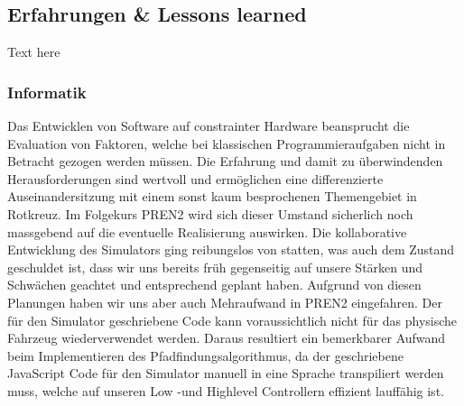 \documentclass[main.tex]{subfiles} %
\begin{document}

\subsection{Erfahrungen \& Lessons learned}

Text here

\subsubsection{Informatik}
Das Entwicklen von Software auf constrainter Hardware beansprucht die Evaluation von
Faktoren, welche bei klassischen Programmieraufgaben nicht in Betracht gezogen werden müssen.
Die Erfahrung und damit zu überwindenden Herausforderungen sind wertvoll und ermöglichen eine differenzierte
Auseinandersitzung mit einem sonst kaum besprochenen Themengebiet in Rotkreuz.
Im Folgekurs PREN2 wird sich dieser Umstand sicherlich noch massgebend auf die eventuelle Realisierung auswirken.
Die kollaborative Entwicklung des Simulators ging reibungslos von statten, was auch dem Zustand geschuldet ist, dass wir
uns bereits früh gegenseitig auf unsere Stärken und Schwächen geachtet und entsprechend geplant haben.
Aufgrund von diesen Planungen haben wir uns aber auch Mehraufwand in PREN2 eingefahren. Der für den Simulator geschriebene
Code kann voraussichtlich nicht für das physische Fahrzeug wiederverwendet werden. Daraus resultiert ein bemerkbarer
Aufwand beim Implementieren des Pfadfindungsalgorithmus, da der geschriebene JavaScript Code für den Simulator manuell in
eine Sprache transpiliert werden muss, welche auf unseren Low -und Highlevel Controllern effizient lauffähig ist.
\end{document}
